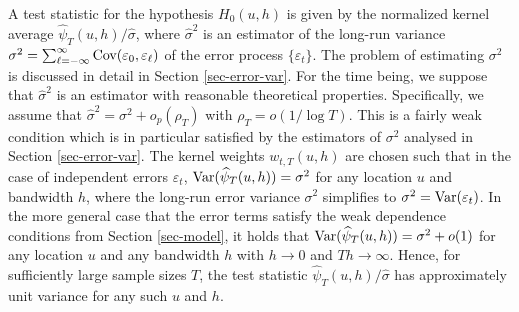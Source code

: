 A test statistic for the hypothesis $H_0(u,h)$ is given by the normalized kernel average $\widehat{\psi}_T(u,h)/\widehat{\sigma}$, where $\widehat{\sigma}^2$ is an estimator of the long-run variance $\sigma^2 = \sum\nolimits_{\ell=-\infty}^{\infty} \textnormal{Cov}(\varepsilon_0,\varepsilon_\ell)$ of the error process $\{\varepsilon_t\}$. The problem of estimating $\sigma^2$ is discussed in detail in Section \ref{sec-error-var}. For the time being, we suppose that $\widehat{\sigma}^2$ is an estimator with reasonable theoretical properties. Specifically, we assume that $\widehat{\sigma}^2 = \sigma^2 + o_p(\rho_T)$ with $\rho_T = o(1/\log T)$. This is a fairly weak condition which is in particular satisfied by the estimators of $\sigma^2$ analysed in Section \ref{sec-error-var}. The kernel weights $w_{t,T}(u,h)$ are chosen such that in the case of independent errors $\varepsilon_t$, $\textnormal{Var}(\widehat{\psi}_T(u,h)) = \sigma^2$ for any location $u$ and bandwidth $h$, where the long-run error variance $\sigma^2$ simplifies to $\sigma^2 = \textnormal{Var}(\varepsilon_t)$. In the more general case that the error terms satisfy the weak dependence conditions from Section \ref{sec-model}, it holds that $\textnormal{Var}(\widehat{\psi}_T(u,h)) = \sigma^2 + o(1)$ for any location $u$ and any bandwidth $h$ with $h \rightarrow 0$ and $Th \rightarrow \infty$. Hence, for sufficiently large sample sizes $T$, the test statistic $\widehat{\psi}_T(u,h)/\widehat{\sigma}$ has approximately unit variance for any such $u$ and $h$.


